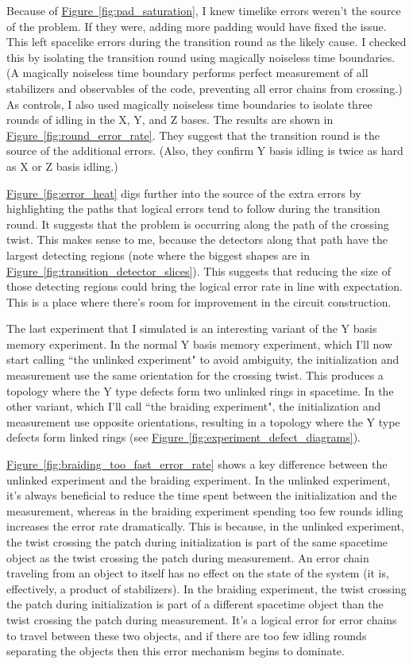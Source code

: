 \documentclass[onecolumn,unpublished,a4paper]{quantumarticle}
\theoremstyle{definition}
\theoremstyle{definition}
\theoremstyle{definition}
\newcommand{\fig}[1]{\hyperref[fig:#1]{Figure~\ref*{fig:#1}}}
\begin{document}
Because of \fig{pad_saturation}, I knew timelike errors weren't the source of the problem.
If they were, adding more padding would have fixed the issue.
This left spacelike errors during the transition round as the likely cause.
I checked this by isolating the transition round using magically noiseless time boundaries.
(A magically noiseless time boundary performs perfect measurement of all stabilizers and observables of the code, preventing all error chains from crossing.)
As controls, I also used magically noiseless time boundaries to isolate three rounds of idling in the X, Y, and Z bases.
The results are shown in \fig{round_error_rate}.
They suggest that the transition round is the source of the additional errors.
(Also, they confirm Y basis idling is twice as hard as X or Z basis idling.)

\fig{error_heat} digs further into the source of the extra errors by highlighting the paths that logical errors tend to follow during the transition round.
It suggests that the problem is occurring along the path of the crossing twist.
This makes sense to me, because the detectors along that path have the largest detecting regions (note where the biggest shapes are in \fig{transition_detector_slices}).
This suggests that reducing the size of those detecting regions could bring the logical error rate in line with expectation.
This is a place where there's room for improvement in the circuit construction.

The last experiment that I simulated is an interesting variant of the Y basis memory experiment.
In the normal Y basis memory experiment, which I'll now start calling ``the unlinked experiment" to avoid ambiguity, the initialization and measurement use the same orientation for the crossing twist.
This produces a topology where the Y type defects form two unlinked rings in spacetime.
In the other variant, which I'll call ``the braiding experiment", the initialization and measurement use opposite orientations, resulting in a topology where the Y type defects form linked rings (see \fig{experiment_defect_diagrams}).

\fig{braiding_too_fast_error_rate} shows a key difference between the unlinked experiment and the braiding experiment.
In the unlinked experiment, it's always beneficial to reduce the time spent between the initialization and the measurement, whereas in the braiding experiment spending too few rounds idling increases the error rate dramatically.
This is because, in the unlinked experiment, the twist crossing the patch during initialization is part of the same spacetime object as the twist crossing the patch during measurement.
An error chain traveling from an object to itself has no effect on the state of the system (it is, effectively, a product of stabilizers).
In the braiding experiment, the twist crossing the patch during initialization is part of a different spacetime object than the twist crossing the patch during measurement.
It's a logical error for error chains to travel between these two objects, and if there are too few idling rounds separating the objects then this error mechanism begins to dominate.
\end{document}
